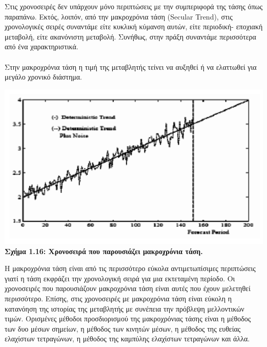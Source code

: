 Στις χρονοσειρές δεν υπάρχουν μόνο περιπτώσεις με την συμπεριφορά της τάσης όπως παραπάνω. Εκτός, λοιπόν, από την μακροχρόνια τάση (Secular
Trend), στις χρονολογικές σειρές συναντάμε είτε κυκλική κύμανση αυτών, είτε
περιοδική- εποχιακή μεταβολή, είτε ακανόνιστη μεταβολή. Συνήθως, στην πράξη
συναντάμε περισσότερα από ένα χαρακτηριστικά.\\\\
Στην μακροχρόνια τάση η τιμή της μεταβλητής τείνει να αυξηθεί ή να
ελαττωθεί για μεγάλο χρονικό διάστημα.
\begin{center}
\includegraphics[scale=0.5]{graf14.png}\\
\textbf{Σχήμα 1.16: Xρονοσειρά που παρουσιάζει μακροχρόνια τάση.}
\end{center}

Η μακροχρόνια τάση είναι από τις περισσότερο εύκολα αντιμετωπίσιμες
περιπτώσεις γιατί η τάση εκφράζει την χρονολογική σειρά για μια εκτεταμένη
περίοδο. Οι χρονοσειρές που παρουσιάζουν μακροχρόνια τάση είναι αυτές που έχουν μελετηθεί περισσότερο. Επίσης, στις χρονοσειρές με μακροχρόνια
τάση είναι εύκολη η κατανόηση της ιστορίας της μεταβλητής με συνέπεια την
πρόβλεψη μελλοντικών τιμών. Ορισμένες μέθοδοι προσδιορισμού της μακροχρόνιας
τάσης είναι η μέθοδος των δυο μέσων σημείων, η μέθοδος των κινητών μέσων, η
μέθοδος της ευθείας ελαχίστων τετραγώνων, η μέθοδος της καμπύλης ελαχίστων τετραγώνων και άλλα.\\

